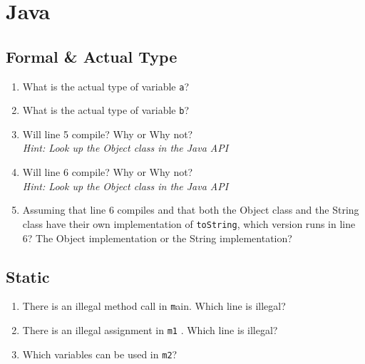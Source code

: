 \documentclass{article}
\begin{document}
\newcommand{\var}[1]{\texttt{#1}}
\newcommand{\java}[1]{}
\newcommand{\sol}[1]{\\}
\section{Java}
	\subsection{Formal \& Actual Type}
		
	\begin{enumerate}
		\item What is the actual type of variable \var a? \sol{Object}
		\item What is the actual type of variable \var b? \sol{String}
		\item Will line 5 compile? Why or Why not? \\ \emph{Hint: Look up the Object
		class in the Java API} \sol{Yes. The Object class has a
		hashCode method.}
		\item Will line 6 compile? Why or Why not? \\ \emph{Hint: Look
		up the Object class in the Java API} \sol{Yes. The Object class
		has a toString method.}
		\item Assuming that line 6 compiles and that both the Object class
		and the String class have their own implementation of
		\var{toString}, which version runs in line 6? The
		Object implementation or the String implementation? \sol{The
		String implementation. The actual type is what decides which
		implementation runs.}
	\end{enumerate}

	\subsection{Static}
	\java{q2.java}
	\begin{enumerate}
		\item There is an illegal method call in \var main. Which line
		is illegal? \sol{Line 12. Static methods can only directly call
		other static methods.}
		\item There is an illegal assignment in \var{m1} . Which line is
		illegal? \sol{Line 5. Static methods can only use static
		variables.}
		\item Which variables can be used in \var{m2}? \sol{x and y.
		Non-static methods can use both static and non-static
		variables.}
	\end{enumerate}
\end{document}
